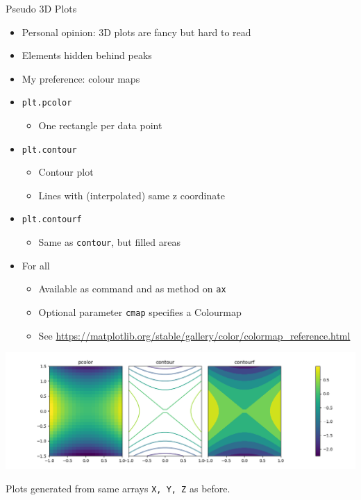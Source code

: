 
\begin{frame}[fragile]{Pseudo 3D Plots}
%
\begin{itemize}
\item Personal opinion: 3D plots are fancy but hard to read
\item Elements hidden behind peaks
\item My preference: colour maps
\item \texttt{plt.pcolor}
	\begin{itemize}
	\item One rectangle per data point
	\end{itemize}
\item \texttt{plt.contour}
	\begin{itemize}
	\item Contour plot
	\item Lines with (interpolated) same z coordinate
	\end{itemize}
\item \texttt{plt.contourf}
	\begin{itemize}
	\item Same as \texttt{contour}, but filled areas
	\end{itemize}
\item For all
	\begin{itemize}
	\item Available as command and as method on \texttt{ax}
	\item Optional parameter \texttt{cmap} specifies a Colourmap
	\item See \url{https://matplotlib.org/stable/gallery/color/colormap_reference.html}
	\end{itemize}
\end{itemize}
%
\end{frame}


\begin{frame}
%
\begin{tcolorbox}[title=Pseudo 3D Plots]
	\includegraphics[width=\linewidth]{./gfx/plt-falseColour}
	
	\scriptsize
	Plots generated from same arrays \texttt{X, Y, Z} as before.
\end{tcolorbox}
%
\end{frame}

